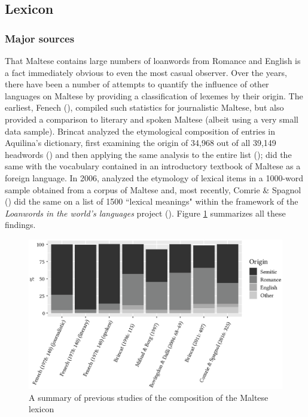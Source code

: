 \documentclass[output=paper]{langsci/langscibook}
\begin{document}


\subsection{Lexicon} \label{mtlexicon} %
\subsubsection{Major sources}
That Maltese contains large numbers of loanwords from Romance and English is a fact immediately obvious to even the most casual observer. Over the years, there have been a number of attempts to quantify the influence of other languages on Maltese by providing a classification of lexemes by their origin. The earliest, Fenech (\citeyear[216--217]{fenech1978}), compiled such statistics for journalistic Maltese, but also provided a comparison to literary and spoken Maltese (albeit using a very small data sample). Brincat analyzed the etymological composition of entries in Aquilina's dictionary, first examining the origin of 34,968 out of all 39,149 headwords (\citealt[115]{brincat1996}) and then applying the same analysis to the entire list (\citealt[407]{brincat2011});  \cite{mifsudborg1997} did the same with the vocabulary contained in an introductory textbook of Maltese as a foreign language. In 2006, \cite{bovingdondalli2006} analyzed the etymology of lexical items in a 1000-word sample obtained from a corpus of Maltese and, most recently, Comrie \& Spagnol (\citeyear[318]{comriespagnol2016}) did the same on a list of 1500 ``lexical meanings" within the framework of the \textit{Loanwords in the world’s languages} project (\citealt{HaspelmathTadmor2009}). Figure \ref{lexicon} summarizes all these findings.
\begin{figure}[H]
\centering
\includegraphics[width=12cm]{figures/lexiconnewfont.eps}
\caption{A summary of previous studies of the composition of the Maltese lexicon}
\label{lexicon}
\end{figure}
\end{document}
